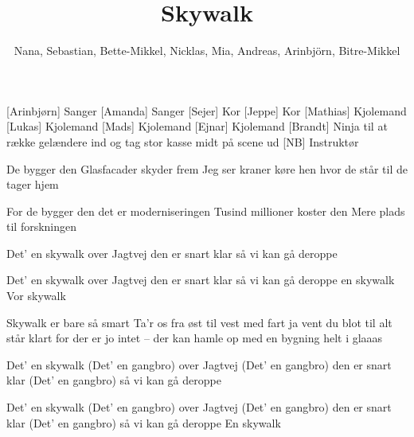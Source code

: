 \documentclass[a4paper,11pt]{article}
\title{Skywalk}
\author{Nana, Sebastian, Bette-Mikkel, Nicklas, Mia, Andreas, Arinbjörn, Bitre-Mikkel}
\begin{document}
\maketitle

\begin{roles}
[Arinbjørn] Sanger
[Amanda] Sanger
[Sejer] Kor
[Jeppe] Kor
[Mathias] Kjolemand
[Lukas] Kjolemand
[Mads] Kjolemand
[Ejnar] Kjolemand
[Brandt] Ninja til at række gelændere ind og tag stor kasse midt på scene ud
[NB] Instruktør
\end{roles}

\begin{song}

 De bygger den
Glasfacader skyder frem
Jeg ser kraner køre hen
hvor de står til de tager hjem


 For de bygger den
det er moderniseringen
Tusind millioner koster den
Mere plads til forskningen


 Det' en skywalk
over Jagtvej
den er snart klar
så vi kan gå deroppe

Det' en skywalk
over Jagtvej
den er snart klar
så vi kan gå deroppe
en skywalk
 Vor skywalk


 Skywalk er bare så smart
Ta'r os fra øst til vest med fart
ja vent du blot til alt står klart
for der er jo intet -- der kan hamle op
med en bygning helt i glaaas


 Det' en skywalk (Det' en gangbro)
over Jagtvej (Det' en gangbro)
den er snart klar (Det' en gangbro)
så vi kan gå deroppe

Det' en skywalk (Det' en gangbro)
over Jagtvej (Det' en gangbro)
den er snart klar (Det' en gangbro)
så vi kan gå deroppe
 En skywalk


\end{song}
\end{document}
